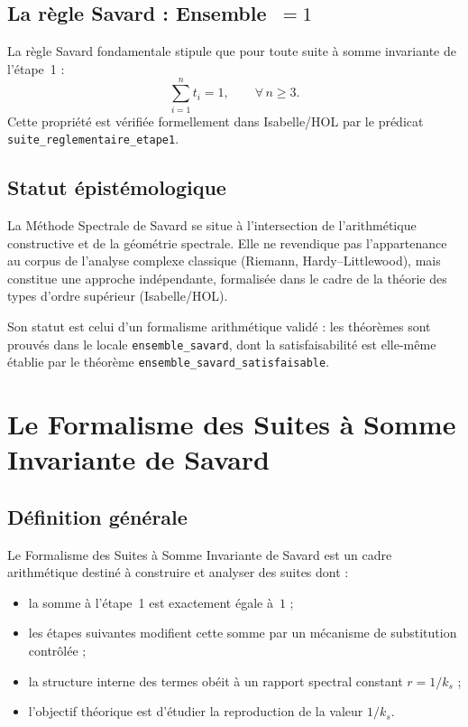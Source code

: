 \documentclass[]{pasj02}
\begin{document}
\subsection{La règle Savard : Ensemble~$= 1$}
\label{ssec:regle}

La règle Savard fondamentale stipule que pour toute suite à somme invariante
de l'étape~1 :
\begin{equation}
  \sum_{i=1}^{n} t_i = 1, \qquad \forall\, n \geq 3.
\end{equation}
Cette propriété est vérifiée formellement dans Isabelle/HOL par le prédicat
\texttt{suite\_reglementaire\_etape1}.

\subsection{Statut épistémologique}
\label{ssec:epist}

La Méthode Spectrale de Savard se situe à l'intersection de l'arithmétique
constructive et de la géométrie spectrale.  Elle ne revendique pas
l'appartenance au corpus de l'analyse complexe classique (Riemann,
Hardy--Littlewood), mais constitue une approche indépendante, formalisée
dans le cadre de la théorie des types d'ordre supérieur (Isabelle/HOL).

Son statut est celui d'un formalisme arithmétique validé : les théorèmes
sont prouvés dans le locale \texttt{ensemble\_savard}, dont la
satisfaisabilité est elle-même établie par le théorème
\texttt{ensemble\_savard\_satisfaisable}.

\section{Le Formalisme des Suites à Somme Invariante de Savard}
\label{sec:formalisme}

\subsection{Définition générale}
\label{ssec:definition}

Le Formalisme des Suites à Somme Invariante de Savard est un cadre
arithmétique destiné à construire et analyser des suites dont :
\begin{itemize}
  \item la somme à l'étape~1 est exactement égale à~$1$ ;
  \item les étapes suivantes modifient cette somme par un mécanisme de
        substitution contrôlée ;
  \item la structure interne des termes obéit à un rapport spectral constant
        $r = 1/k_s$ ;
  \item l'objectif théorique est d'étudier la reproduction de la valeur
        $1/k_s$.
\end{itemize}
\end{document}
